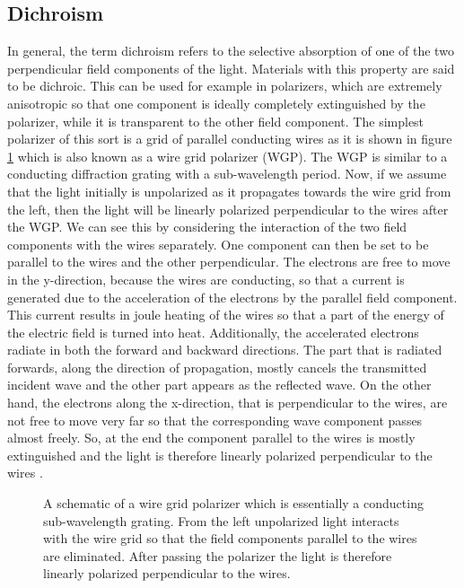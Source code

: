 \subsection{Dichroism}
\label{sec:dichroism}
In general, the term dichroism refers to the selective absorption of one of the two perpendicular field components of the light. Materials with this property are said to be dichroic. This can be used for example in polarizers, which are extremely anisotropic so that one component is ideally completely extinguished by the polarizer, while it is transparent to the other field component. The simplest polarizer of this sort is a grid of parallel conducting wires as it is shown in figure \ref{fig:wire_grid_polarizer} which is also known as a wire grid polarizer (WGP). The WGP is similar to a conducting diffraction grating with a sub-wavelength period. Now, if we assume that the light initially is unpolarized as it propagates towards the wire grid from the left, then the light will be linearly polarized perpendicular to the wires after the WGP. We can see this by considering the interaction of the two field components with the wires separately. One component can then be set to be parallel to the wires and the other perpendicular. The electrons are free to move in the y-direction, because the wires are conducting, so that a current is generated due to the acceleration of the electrons by the parallel field component. This current results in joule heating of the wires so that a part of the energy of the electric field is turned into heat. Additionally, the accelerated electrons radiate in both the forward and backward directions. The part that is radiated forwards, along the direction of propagation, mostly cancels the transmitted incident wave and the other part appears as the reflected wave. On the other hand, the electrons along the x-direction, that is perpendicular to the wires, are not free to move very far so that the corresponding wave component passes almost freely. So, at the end the component parallel to the wires is mostly extinguished and the light is therefore linearly polarized perpendicular to the wires \cite{Hecht}.

\begin{figure}[h]
    \centering
    
    \caption{A schematic of a wire grid polarizer which is essentially a conducting sub-wavelength grating. From the left unpolarized light interacts with the wire grid so that the field components parallel to the wires are eliminated. After passing the polarizer the light is therefore linearly polarized perpendicular to the wires.}
    \label{fig:wire_grid_polarizer}
\end{figure}

